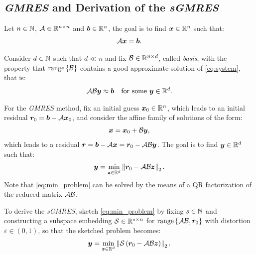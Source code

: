 \subsection{\textit{GMRES} and Derivation of the \textit{sGMRES}}

Let $n \in \mathbb{N}$,  $\mathcal{A} \in \mathbb{R}^{n \times n}$ and $\bm{b} \in \mathbb{R}^{n}$, the goal is to find $\bm{x} \in \mathbb{R}^{n}$ such that:
\begin{align}
    \mathcal{A} \bm{x} = \bm{b}. \label{eq:system}
\end{align}

Consider $d \in \mathbb{N}$ such that $d \ll n$ and fix $\mathcal{B} \in \mathbb{R}^{n \times d}$, called \textit{basis}, with the property that $\operatorname*{range}\left\{\mathcal{B}\right\}$ contains a good approximate solution of \cref{eq:system}, that is:
\begin{align}
    \mathcal{A} \mathcal{B} \bm{y} &\approx \bm{b} &\text{for some } \bm{y} \in \mathbb{R}^{d}. \label{eq:app_system}
\end{align}

For the \textit{GMRES} method, fix an initial guess $\bm{x}_0 \in \mathbb{R}^{n}$, which leads to an initial residual $\bm{r}_0 = \bm{b} - \mathcal{A} \bm{x}_0$, and consider the affine family of solutions of the form:
\begin{align}
    \bm{x} = \bm{x}_0 + \mathcal{B} \bm{y},
\end{align}
which leads to a residual $\bm{r} = \bm{b} - \mathcal{A} \bm{x} = \bm{r}_0 - \mathcal{A} \mathcal{B} \bm{y}$. The goal is to find $\bm{y} \in \mathbb{R}^{d}$ such that:
\begin{align}
    \bm{y} = \min_{\bm{z} \in \mathbb{R}^{d}} \left\lVert \bm{r}_0 - \mathcal{A} \mathcal{B} \bm{z} \right\rVert_2. \label{eq:min_problem}
\end{align}
Note that \cref{eq:min_problem} can be solved by the means of a QR factorization of the reduced matrix $\mathcal{A} \mathcal{B}$.

To derive the \textit{sGMRES}, sketch \cref{eq:min_problem} by fixing $s \in \mathbb{N}$ and constructing a subspace embedding $\mathcal{S} \in \mathbb{R}^{s \times n}$ for $\operatorname*{range}\left\{\mathcal{A} \mathcal{B}, \bm{r}_0\right\}$ with distortion $\varepsilon \in \left(0, 1\right)$, so that the sketched problem becomes:
\begin{align}
    \bm{y} = \min_{\bm{z} \in \mathbb{R}^{d}} \left\lVert  \mathcal{S} \left( \bm{r}_0 - \mathcal{A} \mathcal{B} \bm{z} \right) \right\rVert_2. \label{eq:sketched_min_problem}
\end{align}